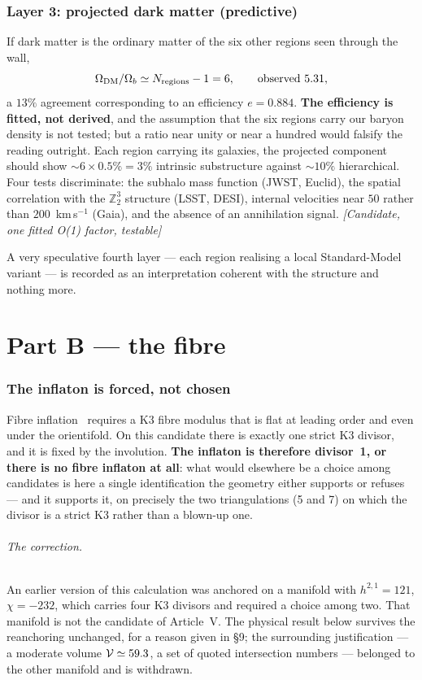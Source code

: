 \section{Layer 3: projected dark matter (predictive)}
If dark matter is the ordinary matter of the six other regions seen through the wall,
\begin{equation}
\Omega_{\rm DM}/\Omega_b\simeq N_{\rm regions}-1=6,\qquad\text{observed }5.31,
\end{equation}
a $13\%$ agreement corresponding to an efficiency $e=0.884$. \textbf{The efficiency is fitted, not derived}, and the assumption that the six regions carry our baryon density is not tested; but a ratio near unity or near a hundred would falsify the reading outright. Each region carrying its galaxies, the projected component should show $\sim6\times0.5\%=3\%$ intrinsic substructure against $\sim10\%$ hierarchical. Four tests discriminate: the subhalo mass function (JWST, Euclid), the spatial correlation with the $\mathbb Z_2^3$ structure (LSST, DESI), internal velocities near $50$ rather than $200$~km\,s$^{-1}$ (Gaia), and the absence of an annihilation signal. \textit{[Candidate, one fitted O(1) factor, testable]}

A very speculative fourth layer --- each region realising a local Standard-Model variant --- is recorded as an interpretation coherent with the structure and nothing more.

\part*{Part B --- the fibre}
\section{The inflaton is forced, not chosen}
Fibre inflation~\cite{CBQ} requires a K3 fibre modulus that is flat at leading order and even under the orientifold. On this candidate there is exactly one strict K3 divisor, and it is fixed by the involution. \textbf{The inflaton is therefore divisor~1, or there is no fibre inflaton at all}: what would elsewhere be a choice among candidates is here a single identification the geometry either supports or refuses --- and it supports it, on precisely the two triangulations (5 and 7) on which the divisor is a strict K3 rather than a blown-up one.

\paragraph{The correction.} An earlier version of this calculation was anchored on a manifold with $h^{2,1}=121$, $\chi=-232$, which carries four K3 divisors and required a choice among two. That manifold is not the candidate of Article~V. The physical result below survives the reanchoring unchanged, for a reason given in \S9; the surrounding justification --- a moderate volume $\mathcal V\simeq59.3$, a set of quoted intersection numbers --- belonged to the other manifold and is withdrawn.

